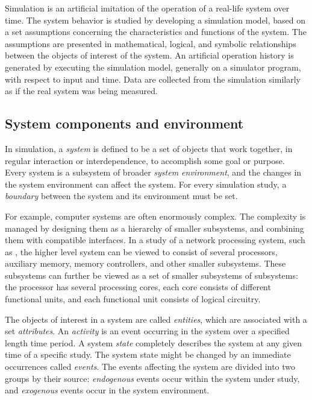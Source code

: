 Simulation is an artificial imitation of the operation of a real-life system over time. The system behavior is studied by developing a simulation model, based on a set assumptions concerning the characteristics and functions of the system. The assumptions are presented in mathematical, logical, and symbolic relationships between the objects of interest of the system. An artificial operation history is generated by executing the simulation model, generally on a simulator program, with respect to input and time. Data are collected from the simulation similarly as if the real system was being measured.

\subsection{System components and environment}
\label{sec:syst-comp-envir}

In simulation, a \emph{system} is defined to be a set of objects that work together, in regular interaction or interdependence, to accomplish some goal or purpose. Every system is a subsystem of broader \emph{system environment}, and the changes in the system environment can affect the system. For every simulation study, a \emph{boundary} between the system and its environment must be set. \cite{Banks:2010:DES}

For example, computer systems are often enormously complex. The complexity is managed by designing them as a hierarchy of smaller subsystems, and combining them with compatible interfaces. In a study of a network processing system, such as \cite{cavium OCTEON}, the higher level system can be viewed to consist of several processors, auxiliary memory, memory controllers, and other smaller subsystems. These subsystems can further be viewed as a set of smaller subsystems of subsystems: the processor has several processing cores, each core consists of different functional units, and each functional unit consists of logical circuitry. \cite{Banks:2010:DES}

The objects of interest in a system are called \emph{entities}, which are associated with a set \emph{attributes}. An \emph{activity} is an event occurring in the system over a specified length time period. A system \emph{state} completely describes the system at any given time of a specific study. The system state might be changed by an immediate occurrences called \emph{events}. The events affecting the system are divided into two groups by their source: \emph{endogenous} events occur within the system under study, and \emph{exogenous} events occur in the system environment. \cite{Banks:2010:DES}

